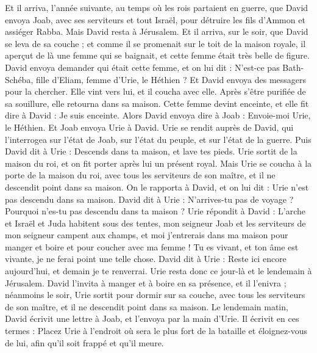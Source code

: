 \begin{multicols}{2}
\VerseOne{}Et il arriva, l’année suivante, au temps où les rois partaient en guerre, que David envoya Joab, avec ses serviteurs et tout Israël, pour détruire les fils d’Ammon et assiéger Rabba. Mais David resta à Jérusalem.
Et il arriva, sur le soir, que David se leva de sa couche ; et comme il se promenait sur le toit de la maison royale, il aperçut de là une femme qui se baignait, et cette femme était très belle de figure.
David envoya demander qui était cette femme, et on lui dit : N'est-ce pas Bath-Schéba, fille d'Eliam, femme d'Urie, le Héthien ?
Et David envoya des messagers pour la chercher. Elle vint vers lui, et il coucha avec elle. Après s’être purifiée de sa souillure, elle retourna dans sa maison.
Cette femme devint enceinte, et elle fit dire à David : Je suis enceinte.
Alors David envoya dire à Joab : Envoie-moi Urie, le Héthien. Et Joab envoya Urie à David.
Urie se rendit auprès de David, qui l’interrogea sur l'état de Joab, sur l'état du peuple, et sur l'état de la guerre.
Puis David dit à Urie : Descends dans ta maison, et lave tes pieds. Urie sortit de la maison du roi, et on fit porter après lui un présent royal.
Mais Urie se coucha à la porte de la maison du roi, avec tous les serviteurs de son maître, et il ne descendit point dans sa maison.
On le rapporta à David, et on lui dit : Urie n'est pas descendu dans sa maison. David dit à Urie : N’arrives-tu pas de voyage ? Pourquoi n'es-tu pas descendu dans ta maison ?
Urie répondit à David : L'arche et Israël et Juda habitent sous des tentes, mon seigneur Joab et les serviteurs de mon seigneur campent aux champs, et moi j’entrerais dans ma maison pour manger et boire et pour coucher avec ma femme ! Tu es vivant, et ton âme est vivante, je ne ferai point une telle chose.
David dit à Urie : Reste ici encore aujourd'hui, et demain je te renverrai. Urie resta donc ce jour-là et le lendemain à Jérusalem.
David l'invita à manger et à boire en sa présence, et il l'enivra ; néanmoins le soir, Urie sortit pour dormir sur sa couche, avec tous les serviteurs de son maître, et il ne descendit point dans sa maison.
Le lendemain matin, David écrivit une lettre à Joab, et l’envoya par la main d'Urie.
Il écrivit en ces termes : Placez Urie à l’endroit où sera le plus fort de la bataille et éloignez-vous de lui, afin qu'il soit frappé et qu'il meure.

\end{multicols}

